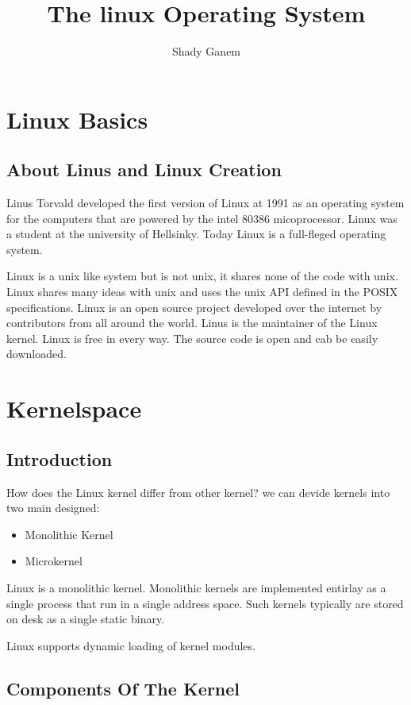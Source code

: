 \documentclass{book}
\title{The linux Operating System}
\author{Shady Ganem}
\begin{document}
\maketitle
\tableofcontents

\part{Linux Basics}

\chapter{About Linus and Linux Creation}
Linus Torvald developed the first version of Linux at 1991 as an operating 
system for the computers that are powered by the intel 80386 micoprocessor.
Linux was a student at the university of Hellsinky. 
Today Linux is a full-fleged operating system. \par
Linux is a unix like system but is not unix, it shares none of the code with unix.
Linux shares many ideas with unix and uses the unix API defined in the POSIX specifications.
Linux is an open source project developed over the internet by contributors from all around the world. 
Linus is the maintainer of the Linux kernel.  
Linux is free in every way. The source code is open and cab be easily downloaded.

\part{Kernelspace}

\chapter{Introduction}
How does the Linux kernel differ from other kernel?
we can devide kernels into two main designed: 
\begin{itemize}
\item Monolithic Kernel
\item Microkernel
\end{itemize} 
Linux is a monolithic kernel. Monolithic kernels are implemented entirlay 
as a single process that run in a single address space. Such kernels 
typically are stored on desk as a single static binary.\par
Linux supports dynamic loading of kernel modules.

\chapter{Components Of The Kernel}
\end{document}
